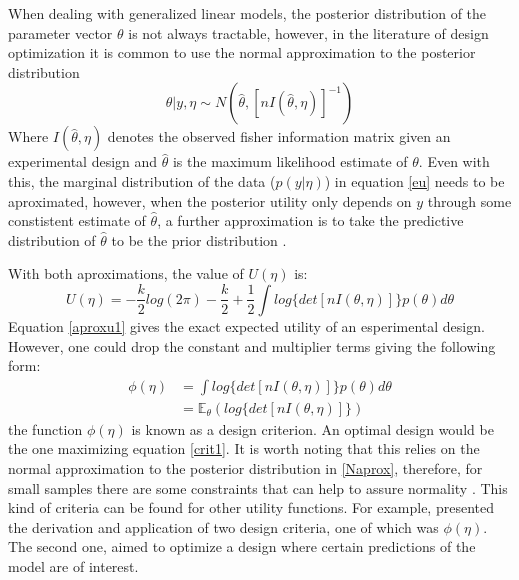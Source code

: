 \documentclass[preprint,review,12pt]{elsarticle}
\begin{document}
When dealing with generalized linear models, the posterior distribution of the parameter vector $\theta$ is not always tractable, however, in the literature of design optimization it is common to use the normal approximation to the posterior distribution
\begin{equation}
\theta|y,\eta \sim N\left(\hat{\theta},[nI(\hat{\theta},\eta)]^{-1}\right)
\label{Naprox}
\end{equation}
Where $I(\hat{\theta},\eta)$ denotes the observed fisher information matrix given an experimental design and $\hat{\theta}$ is the maximum likelihood estimate of $\theta$. Even with this, the marginal distribution of the data ($p(y|\eta)$) in equation \ref{eu} needs to be aproximated, however, when the posterior utility only depends on $y$ through some constistent estimate of $\hat{\theta}$, a further approximation is to take the predictive distribution of  $\hat{\theta}$ to be the prior distribution \cite{chalar1989}.

With both aproximations, the value of $U(\eta)$ is:
\begin{equation}
U(\eta)=-\frac{k}{2}log(2\pi)-\frac{k}{2}+\frac{1}{2} \int log \{det[nI(\theta,\eta)]\} p(\theta) d\theta
\label{aproxu1}
\end{equation}
Equation \ref{aproxu1} gives the exact expected utility of an esperimental design. However, one could drop the constant and multiplier terms giving the following form:
\begin{align}
\phi(\eta) & = \int log \{det[nI(\theta,\eta)]\} p(\theta) d\theta \\
           & = \mathbb{E}_\theta \left( log\{det[nI(\theta,\eta)]\} \right)
\label{crit1}
\end{align}
the function $\phi(\eta)$ is known as a design criterion. An optimal design would be the one maximizing equation \ref{crit1}. It is worth noting that this relies on the normal approximation to the posterior distribution in \ref{Naprox}, therefore, for small samples there are some constraints that can help to assure normality \citep[see][]{CLCH2002}. This kind of criteria can be found for other utility functions. For example, \citet{chalar1989} presented the derivation and application of two design criteria, one of which was $\phi(\eta)$. The second one, aimed to optimize a design where certain predictions of the model are of interest.
\end{document}

